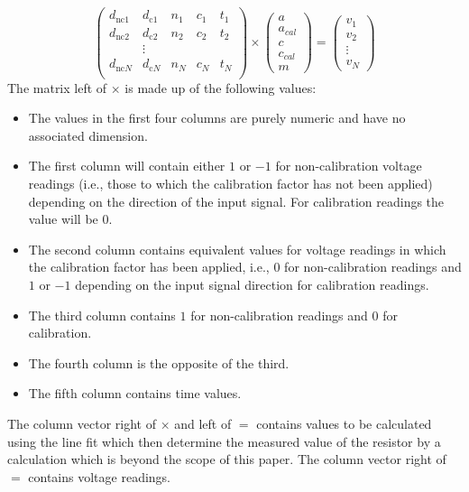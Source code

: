 \documentclass{IMEKO2024}
\begin{document}
\[
\begin{pmatrix*}
  d_{\textrm{nc}1} & d_{\textrm{c}1} & n_1 & c_1 & t_1  \\
  d_{\textrm{nc}2} & d_{\textrm{c}2} & n_2 & c_2 & t_2  \\
   & \vdots &  & & \\
  d_{\textrm{nc}N} & d_{\textrm{c}N} & n_N & c_N & t_N  \\
\end{pmatrix*}
\times
\begin{pmatrix}
  a \\
  a_{cal} \\
  c \\
  c_{cal} \\
  m
\end{pmatrix}
=
\begin{pmatrix}
  v_1 \\
  v_2 \\
  \vdots \\
  v_N
\end{pmatrix}
\]
%
The matrix left of $\times$ is made up of the following values:
%
\begin{itemize}
    \item The values in the first four columns are purely numeric and have no associated dimension.

    \item The first column will contain either $1$ or $-1$ for non-calibration voltage readings (i.e., those to which the calibration factor has not been applied) depending on the direction of the input signal. For calibration readings the value will be $0$.

    \item The second column contains equivalent values for voltage readings in which the calibration factor has been applied, i.e., $0$ for non-calibration readings and $1$ or $-1$ depending on the input signal direction for calibration readings.

    \item The third column contains $1$ for non-calibration readings and $0$ for calibration.

    \item The fourth column is the opposite of the third.

    \item The fifth column contains time values.
\end{itemize}

The column vector right of $\times$ and left of $=$ contains values to
be calculated using the line fit which then determine the measured
value of the resistor by a calculation which is beyond the scope of
this paper. The column vector right of $=$ contains voltage readings.
\end{document}
